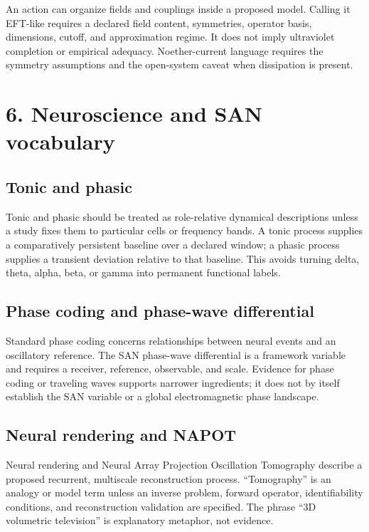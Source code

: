 \documentclass[
  american,
  11pt,
  letterpaper,
]{article}
\begin{document}
An action can organize fields and couplings inside a proposed model. Calling it EFT-like requires a declared field content, symmetries, operator basis, dimensions, cutoff, and approximation regime. It does not imply ultraviolet completion or empirical adequacy. Noether-current language requires the symmetry assumptions and the open-system caveat when dissipation is present.

\section{6. Neuroscience and SAN vocabulary}\label{neuroscience-and-san-vocabulary}

\subsection{Tonic and phasic}\label{tonic-and-phasic}

Tonic and phasic should be treated as role-relative dynamical descriptions unless a study fixes them to particular cells or frequency bands. A tonic process supplies a comparatively persistent baseline over a declared window; a phasic process supplies a transient deviation relative to that baseline. This avoids turning delta, theta, alpha, beta, or gamma into permanent functional labels.

\subsection{Phase coding and phase-wave differential}\label{phase-coding-and-phase-wave-differential}

Standard phase coding concerns relationships between neural events and an oscillatory reference. The SAN phase-wave differential is a framework variable and requires a receiver, reference, observable, and scale. Evidence for phase coding or traveling waves supports narrower ingredients; it does not by itself establish the SAN variable or a global electromagnetic phase landscape.

\subsection{Neural rendering and NAPOT}\label{neural-rendering-and-napot}

Neural rendering and Neural Array Projection Oscillation Tomography describe a proposed recurrent, multiscale reconstruction process. ``Tomography'' is an analogy or model term unless an inverse problem, forward operator, identifiability conditions, and reconstruction validation are specified. The phrase ``3D volumetric television'' is explanatory metaphor, not evidence.
\end{document}
